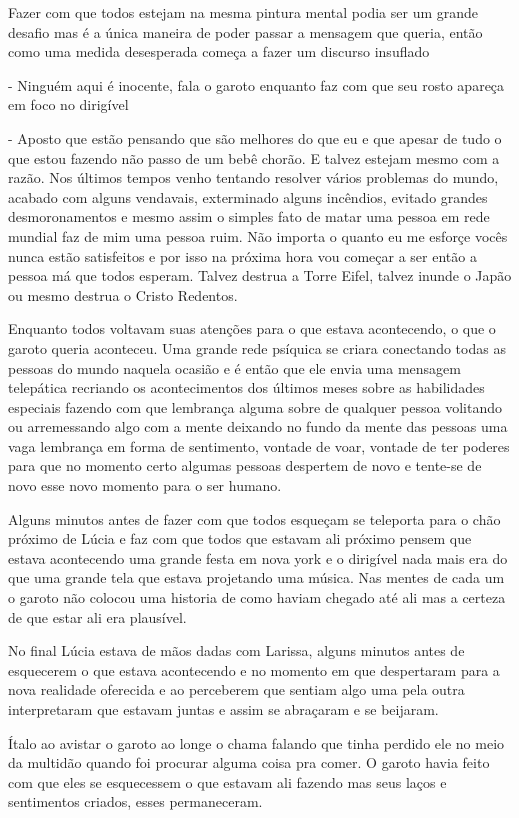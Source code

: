 Fazer com que todos estejam na mesma pintura mental podia ser um grande desafio mas é a única maneira de poder passar a mensagem que queria, então como uma medida desesperada começa a fazer um discurso insuflado

- Ninguém aqui é inocente, fala o garoto enquanto faz com que seu rosto apareça em foco no dirigível

- Aposto que estão pensando que são melhores do que eu e que apesar de tudo o que estou fazendo não passo de um bebê chorão. E talvez estejam mesmo com a razão. Nos últimos tempos venho tentando resolver vários problemas do mundo, acabado com alguns vendavais, exterminado alguns incêndios, evitado grandes desmoronamentos e mesmo assim o simples fato de matar uma pessoa em rede mundial faz de mim uma pessoa ruim. Não importa o quanto eu me esforçe vocês nunca estão satisfeitos e por isso na próxima hora vou começar a ser então a pessoa má que todos esperam. Talvez destrua a Torre Eifel, talvez inunde o Japão ou mesmo destrua o Cristo Redentos.

Enquanto todos voltavam suas atenções para o que estava acontecendo, o que o garoto queria aconteceu. Uma grande rede psíquica se criara conectando todas as pessoas do mundo naquela ocasião e é então que ele envia uma mensagem telepática recriando os acontecimentos dos últimos meses sobre as habilidades especiais fazendo com que lembrança alguma sobre de qualquer pessoa volitando ou arremessando algo com a mente deixando no fundo da mente das pessoas uma vaga lembrança em forma de sentimento, vontade de voar, vontade de ter poderes para que no momento certo algumas pessoas despertem de novo e tente-se de novo esse novo momento para o ser humano.

Alguns minutos antes de fazer com que todos esqueçam se teleporta para o chão próximo de Lúcia e faz com que todos que estavam ali próximo pensem que estava acontecendo uma grande festa em nova york e o dirigível nada mais era do que uma grande tela que estava projetando uma música. Nas mentes de cada um o garoto não colocou uma historia de como haviam chegado até ali mas a certeza de que estar ali era plausível.

No final Lúcia estava de mãos dadas com Larissa, alguns minutos antes de esquecerem o que estava acontecendo e no momento em que despertaram para a nova realidade oferecida e ao perceberem que sentiam algo uma pela outra interpretaram que estavam juntas e assim se abraçaram e se beijaram.

Ítalo ao avistar o garoto ao longe o chama falando que tinha perdido ele no meio da multidão quando foi procurar alguma coisa pra comer. O garoto havia feito com que eles se esquecessem o que estavam ali fazendo mas seus laços e sentimentos criados, esses permaneceram.


